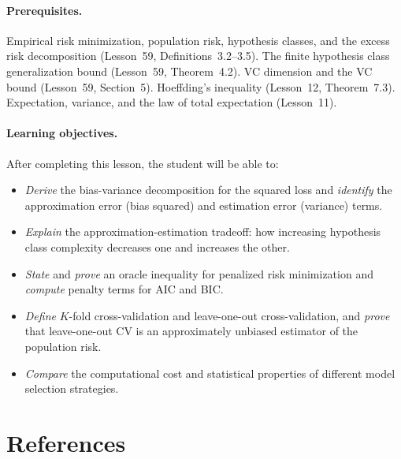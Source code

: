 \documentclass[11pt,a4paper]{article}
\begin{document}
\paragraph{Prerequisites.}
Empirical risk minimization, population risk, hypothesis classes, and
the excess risk decomposition (Lesson~59, Definitions~3.2--3.5).
The finite hypothesis class generalization bound (Lesson~59,
Theorem~4.2).  VC dimension and the VC bound (Lesson~59,
Section~5).  Hoeffding's inequality (Lesson~12, Theorem~7.3).
Expectation, variance, and the law of total expectation (Lesson~11).

\paragraph{Learning objectives.}
After completing this lesson, the student will be able to:
\begin{itemize}
    \item \emph{Derive} the bias-variance decomposition for the
    squared loss and \emph{identify} the approximation error (bias
    squared) and estimation error (variance) terms.
    \item \emph{Explain} the approximation-estimation tradeoff:
    how increasing hypothesis class complexity decreases one and
    increases the other.
    \item \emph{State} and \emph{prove} an oracle inequality for
    penalized risk minimization and \emph{compute} penalty terms for
    AIC and BIC.
    \item \emph{Define} $K$-fold cross-validation and leave-one-out
    cross-validation, and \emph{prove} that leave-one-out CV is an
    approximately unbiased estimator of the population risk.
    \item \emph{Compare} the computational cost and statistical
    properties of different model selection strategies.
\end{itemize}


\section{References}
\label{sec:references}
\end{document}
